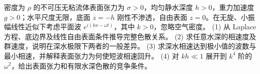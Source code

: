 密度为 \(\rho\) 的不可压无粘流体表面张力为 \(\sigma>0\)，均匀静水深度 \(h>0\)，重力加速度 \(g>0\)；水平尺度无限，底面 \(z=-h\) 刚性不渗透，自由表面 \(z=0\)。在无旋、小振幅线性近似下考虑平面波 \(e^{i(kx-\omega t)}\)，其中 \(k>0\)，忽略空气密度。
(1) 从 Laplace 方程、底边界及线性自由表面条件推导完整色散关系。
(2) 求任意水深的相速度及群速度，说明在深水极限下两者的一般差异。
(3) 求深水相速达到极小值的波数与最小相速，并解释表面张力为何使短波相速回升。
(4) 对 \(kh\ll1\) 展开到 \(k^4\) 阶的 \(\omega^2\)，给出表面张力和有限水深色散的竞争条件。
